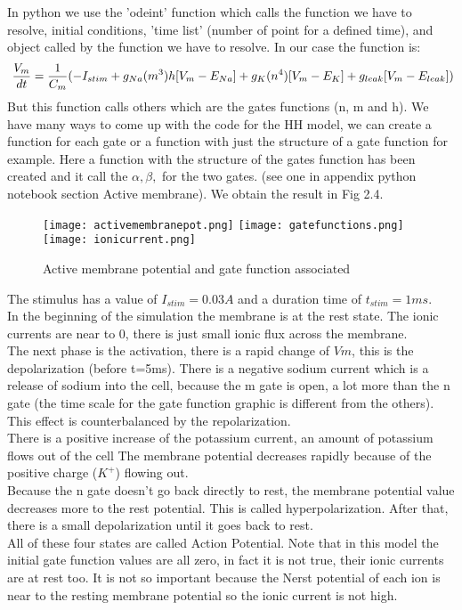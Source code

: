 \documentclass[a4paper,11pt]{report}
\begin{document}
In python we use the 'odeint' function which calls the function we have to resolve, initial conditions, 'time list' (number of point for a defined time), and object called by the function we have to resolve. 
In our case the function is:
$$
\ \frac{V_{m}}{dt} = \frac{1}{C_{m}}(-I_{stim}+g_{Na}(m^3)h[V_{m}-E_{Na}]+g_{K}(n^4)[V_{m}-E_{K}]+g_{leak}[V_{m}-E_{leak}]) \\
$$
But this function calls others which are the gates functions (n, m and h). We have many ways to come up with the code for the HH model, we can create a function for each gate or a function with just the structure of a gate function for example. Here a function with the structure of the gates function has been created and it call the $\alpha , \beta ,$ for the two gates.
(see one in appendix python notebook section Active membrane). We obtain the result in Fig 2.4.
\begin{figure}
\texttt{[image: activemembranepot.png]}\hfill
\texttt{[image: gatefunctions.png]}\hfill
\texttt{[image: ionicurrent.png]}
\caption{Active membrane potential and gate function associated}\label{fig1}
\end{figure}
The stimulus has a value of $I_{stim}=0.03A$ and a duration time of $t_{stim}=1ms$.\\
 In the beginning of the simulation the membrane is at the rest state. The ionic currents are near to 0, there is just small ionic flux across the membrane. \\
 The next phase is the activation, there is a rapid change of $Vm$, this is the depolarization (before t=5ms). There is a negative sodium current which is a release of sodium into the cell, because the m gate is open, a lot more than the n gate (the time scale for the gate function graphic is different from the others). This effect is counterbalanced by the repolarization.  \\
 There is a positive increase of the potassium current, an amount of potassium flows out of the cell The membrane potential decreases rapidly because of the positive charge ($K^{+}$) flowing out. \\
 Because the n gate doesn't go back directly to rest, the membrane potential value decreases more to the rest potential. This is called hyperpolarization. After that, there is a small depolarization until it goes back to rest. \\
 All of these four states are called Action Potential.
 Note that in this model the initial gate function values are all zero, in fact it is not true, their ionic currents are at rest too. It is not so important because the Nerst potential of each ion is near to the resting membrane potential so the ionic current is not high.
   
\end{document}
